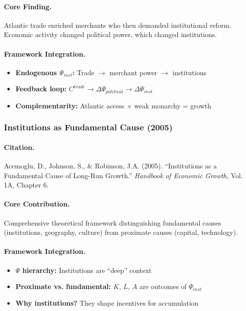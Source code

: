 \documentclass[12pt,a4paper]{article}
\begin{document}
\paragraph{Core Finding.}
Atlantic trade enriched merchants who then demanded institutional reform.
Economic activity changed political power, which changed institutions.

\paragraph{Framework Integration.}
\begin{itemize}
  \item \textbf{Endogenous $\Psi_{inst}$:} Trade $\to$ merchant power $\to$ institutions
  \item \textbf{Feedback loop:} $C^{trade} \to \Delta\Psi_{political} \to \Delta\Psi_{inst}$
  \item \textbf{Complementarity:} Atlantic access $\times$ weak monarchy = growth
\end{itemize}

\subsubsection{Institutions as Fundamental Cause (2005)}

\paragraph{Citation.}
Acemoglu, D., Johnson, S., \& Robinson, J.A. (2005).
``Institutions as a Fundamental Cause of Long-Run Growth.''
\emph{Handbook of Economic Growth}, Vol. 1A, Chapter 6.

\paragraph{Core Contribution.}
Comprehensive theoretical framework distinguishing fundamental causes
(institutions, geography, culture) from proximate causes (capital, technology).

\paragraph{Framework Integration.}
\begin{itemize}
  \item \textbf{$\Psi$ hierarchy:} Institutions are ``deep'' context
  \item \textbf{Proximate vs. fundamental:} $K$, $L$, $A$ are outcomes of $\Psi_{inst}$
  \item \textbf{Why institutions?} They shape incentives for accumulation
\end{itemize}
\end{document}
